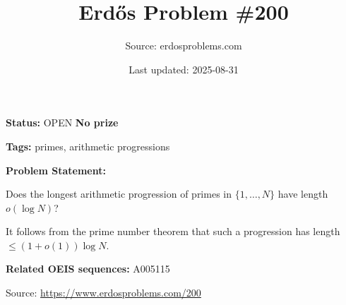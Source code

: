 \documentclass{article}
\title{Erd\H{o}s Problem \#200}
\date{Last updated: 2025-08-31}
\author{Source: erdosproblems.com}
\begin{document}
\maketitle

\noindent\textbf{Status:} OPEN \quad \textbf{No prize}

\noindent\textbf{Tags:} primes, arithmetic progressions

\medskip

\noindent\textbf{Problem Statement:}

Does the longest arithmetic progression of primes in $\{1,\ldots,N\}$ have length $o(\log N)$?




It follows from the prime number theorem that such a progression has length $\leq(1+o(1))\log N$.

\noindent\textbf{Related OEIS sequences:} A005115


\bigskip
\noindent\small{Source: \url{https://www.erdosproblems.com/200}}
\end{document}
